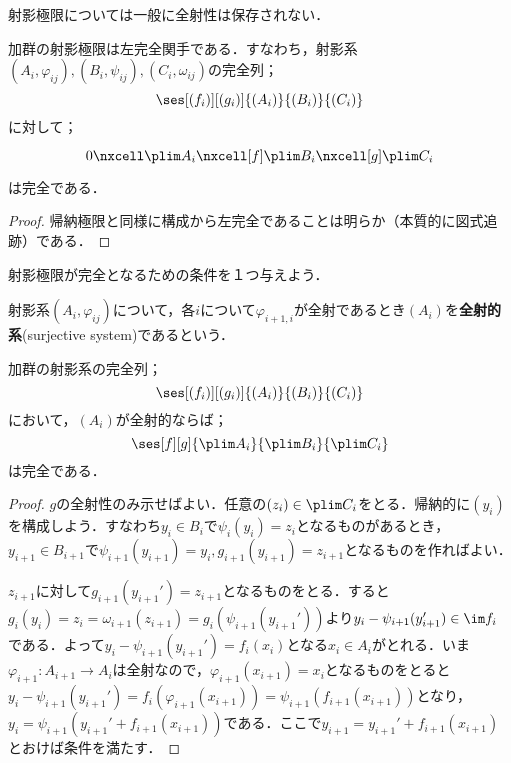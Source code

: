 射影極限については一般に全射性は保存されない．
\begin{prop}
	加群の射影極限は左完全関手である．すなわち，射影系$(A_i,\varphi_{ij}),(B_i,\psi_{ij}),(C_i,\omega_{ij})$の完全列；
	\[\ses[(f_i)][(g_i)]{(A_i)}{(B_i)}{(C_i)}\]
	に対して；
	\[\begin{tikzcd}
	0\nxcell \plim A_i\nxcell[f]\plim B_i\nxcell[g]\plim C_i
	\end{tikzcd}\]
	は完全である．
\end{prop}

\begin{proof}
	帰納極限と同様に構成から左完全であることは明らか（本質的に図式追跡）である．
\end{proof}

射影極限が完全となるための条件を１つ与えよう．
\begin{defi}[全射的系]
	射影系$(A_i,\varphi_{ij})$について，各$i$について$\varphi_{i+1,i}$が全射であるとき$(A_i)$を\textbf{全射的系}(surjective system)であるという．
\end{defi}

\begin{thm}\label{thm:最初がsurjectiveなら射影極限は完全}
	加群の射影系の完全列；
	\[\ses[(f_i)][(g_i)]{(A_i)}{(B_i)}{(C_i)}\]
	において，$(A_i)$が全射的ならば；
	\[\ses[f][g]{\plim A_i}{\plim B_i}{\plim C_i}\]
	は完全である．
\end{thm}

\begin{proof}
	$g$の全射性のみ示せばよい．任意の$(z_i)\in\plim C_i$をとる．帰納的に$(y_i)$を構成しよう．すなわち$y_i\in B_i$で$\psi_i(y_i)=z_i$となるものがあるとき，$y_{i+1}\in B_{i+1}$で$\psi_{i+1}(y_{i+1})=y_i,g_{i+1}(y_{i+1})=z_{i+1}$となるものを作ればよい．
	
	$z_{i+1}$に対して$g_{i+1}(y_{i+1}')=z_{i+1}$となるものをとる．すると$g_i(y_i)=z_i=\omega_{i+1}(z_{i+1})=g_i(\psi_{i+1}(y_{i+1}'))$より$y_i-\psi_{i+1}(y_{i+1}')\in\im f_i$である．よって$y_i-\psi_{i+1}(y_{i+1}')=f_i(x_i)$となる$x_i\in A_i$がとれる．いま$\varphi_{i+1}:A_{i+1}\to A_i$は全射なので，$\varphi_{i+1}(x_{i+1})=x_i$となるものをとると$y_i-\psi_{i+1}(y_{i+1}')=f_i(\varphi_{i+1}(x_{i+1}))=\psi_{i+1}(f_{i+1}(x_{i+1}))$となり，$y_i=\psi_{i+1}(y_{i+1}'+f_{i+1}(x_{i+1}))$である．ここで$y_{i+1}=y_{i+1}'+f_{i+1}(x_{i+1})$とおけば条件を満たす．
\end{proof}